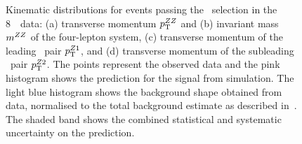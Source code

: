 \begin{figure}[htbp]
    \begin{center}
    \caption[Kinematic distributions for events passing the \ZZ\ selection in
    the 8~\tev\ data.]
    {Kinematic distributions for events passing the \ZZ\ selection in
    the 8~\tev\ data: (a) transverse momentum $p_{\mathrm{T}}^{ZZ}$ and (b) invariant mass $m^{ZZ}$ of the 
    four-lepton system, (c) transverse momentum of the leading
    \dilep\ pair $p_{\mathrm{T}}^{Z1}$, and (d) transverse momentum of the subleading
    \dilep\ pair $p_{\mathrm{T}}^{Z2}$. The points represent the observed data and the pink histogram
    shows the prediction for the signal from simulation. The light blue
    histogram shows the background shape obtained from data, normalised to the
    total background estimate as described in~. The shaded band 
    shows the combined statistical and systematic uncertainty on the prediction. 
    }
    \label{fig:zzdists-ZZ-eight}
    \end{center}
\end{figure}

